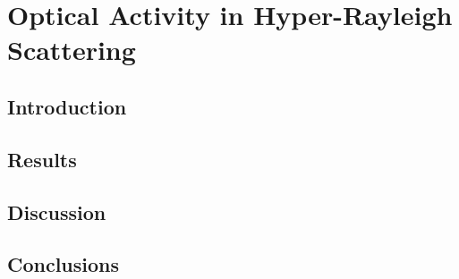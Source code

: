 \chapter{Optical Activity in Hyper-Rayleigh Scattering}
\section{Introduction}
\section{Results}
\section{Discussion}
\section{Conclusions}